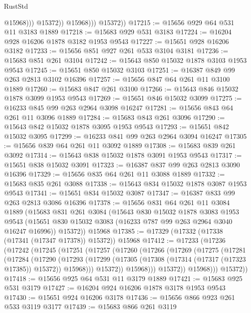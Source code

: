 \begin{lexlean}{RustStd}
\begin{coremodule}
                        @15968)))
                  @15372))
              @15968)))
        @15372))
@17215 := @15656 @929 @64 @531 @11 @3183 @1889
@17218 := @15683 @929 @531 @3183
@17224 := @16204 @928 @16206 @1878 @3182 @1953 @9543
@17227 := @15651 @928 @16206 @3182
@17233 := @15656 @851 @927 @261 @533 @3104 @3181
@17236 := @15683 @851 @261 @3104
@17242 := @15643 @850 @15032 @1878 @3103 @1953 @9543
@17245 := @15651 @850 @15032 @3103
@17251 := @16387 @849 @99 @263 @2813 @3102 @16396
@17257 := @15656 @847 @64 @261 @11 @3100 @1889
@17260 := @15683 @847 @261 @3100
@17266 := @15643 @846 @15032 @1878 @3099 @1953 @9543
@17269 := @15651 @846 @15032 @3099
@17275 := @16233 @845 @99 @263 @2964 @3098 @16247
@17281 := @15656 @843 @64 @261 @11 @3096 @1889
@17284 := @15683 @843 @261 @3096
@17290 := @15643 @842 @15032 @1878 @3095 @1953 @9543
@17293 := @15651 @842 @15032 @3095
@17299 := @16233 @841 @99 @263 @2964 @3094 @16247
@17305 := @15656 @839 @64 @261 @11 @3092 @1889
@17308 := @15683 @839 @261 @3092
@17314 := @15643 @838 @15032 @1878 @3091 @1953 @9543
@17317 := @15651 @838 @15032 @3091
@17323 := @16387 @837 @99 @263 @2813 @3090 @16396
@17329 := @15656 @835 @64 @261 @11 @3088 @1889
@17332 := @15683 @835 @261 @3088
@17338 := @15643 @834 @15032 @1878 @3087 @1953 @9543
@17341 := @15651 @834 @15032 @3087
@17347 := @16387 @833 @99 @263 @2813 @3086 @16396
@17378 := @15656
    @831
    @64
    @261
    @11
    @3084
    @1889
    (@15683
      @831
      @261
      @3084
      (@15643
        @830
        @15032
        @1878
        @3083
        @1953
        @9543
        (@15651 @830 @15032 @3083 (@16233 @787 @99 @263 @2964 @3040 @16247 @16996))
        @15372))
    @15968
@17385 := @17329 (@17332 (@17338 (@17341 (@17347 @17378)) @15372)) @15968
@17412 := @17233
    (@17236
      (@17242
        (@17245
          (@17251
            (@17257
              (@17260
                (@17266
                  (@17269
                    (@17275
                      (@17281
                        (@17284
                          (@17290
                            (@17293
                              (@17299
                                (@17305 (@17308 (@17314 (@17317 (@17323 @17385)) @15372)) @15968)))
                            @15372))
                        @15968)))
                  @15372))
              @15968)))
        @15372))
@17418 := @15656 @925 @64 @531 @11 @3179 @1889
@17421 := @15683 @925 @531 @3179
@17427 := @16204 @924 @16206 @1878 @3178 @1953 @9543
@17430 := @15651 @924 @16206 @3178
@17436 := @15656 @866 @923 @261 @533 @3119 @3177
@17439 := @15683 @866 @261 @3119

\end{coremodule}
\end{lexlean}
